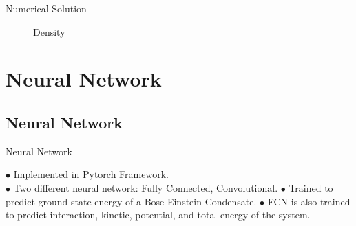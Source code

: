 \documentclass{beamer}
\begin{document}
\begin{frame}{Numerical Solution}

%        
%        
%        
%        



\begin{figure}[H]
	
    \caption{Density}
	\label{fig:a}
\end{figure}

\end{frame}



\section{Neural Network}
\subsection{Neural Network}
\begin{frame}{Neural Network}

$\bullet$ Implemented in Pytorch Framework.\\
\vskip 0.5cm
$\bullet$ Two different neural network: Fully Connected, Convolutional.
\vskip 0.5cm
$\bullet$ Trained to predict ground state energy of a Bose-Einstein Condensate.
\vskip 0.5cm
$\bullet$ FCN is also trained to predict interaction, kinetic, potential, and total energy of the system.

\end{frame}
\end{document}
